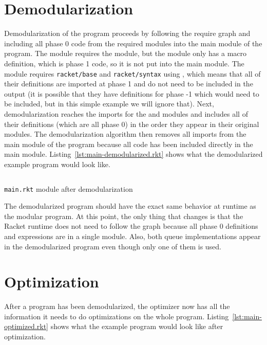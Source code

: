 \section{Demodularization}

Demodularization of the program proceeds by following the require graph and including all phase 0 code from the required modules into the main module of the program. 
The  module requires the  module, but the  module only has a macro definition, which is phase 1 code, so it is not put into the main module.
The  module requires \texttt{racket/base} and \texttt{racket/syntax} using , which means that all of their definitions are imported at phase 1 and do not need to be included in the output (it is possible that they have definitions for phase -1 which would need to be included, but in this simple example we will ignore that). 
Next, demodularization reaches the imports for the  and  modules and includes all of their definitions (which are all phase 0) in the order they appear in their original modules.
The demodularization algorithm then removes all imports from the main module of the program because all code has been included directly in the main module.
Listing~\ref{lst:main-demodularized.rkt} shows what the demodularized example program would look like.

\begin{listing}
  \inputminted{racket}{listings/main-demodularized.rkt}
  \caption{\texttt{main.rkt} module after demodularization}
  \label{lst:main-demodularized.rkt}
\end{listing}

The demodularized program should have the exact same behavior at runtime as the modular program.
At this point, the only thing that changes is that the Racket runtime does not need to follow the  graph because all phase 0 definitions and expressions are in a single module.
Also, both queue implementations appear in the demodularized program even though only one of them is used.


\section{Optimization}

After a program has been demodularized, the optimizer now has all the information it needs to do optimizations on the whole program.
Listing~\ref{lst:main-optimized.rkt} shows what the example program would look like after optimization.

